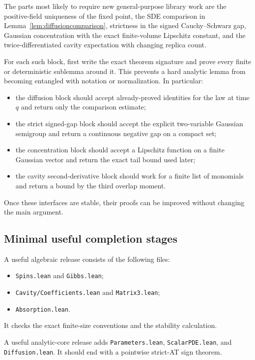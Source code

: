 \documentclass[11pt]{article}
\numberwithin{equation}{section}
\newcommand{\1}{\mathbf 1}
\begin{document}
The parts most likely to require new general-purpose library work are the
positive-field uniqueness of the fixed point, the SDE comparison in
Lemma~\ref{lem:diffusioncomparison}, strictness in the signed
Cauchy--Schwarz gap, Gaussian concentration with the exact finite-volume
Lipschitz constant, and the twice-differentiated cavity expectation with
changing replica count.

For each such block, first write the exact theorem signature and prove every
finite or deterministic sublemma around it.  This prevents a hard analytic
lemma from becoming entangled with notation or normalization.  In
particular:
\begin{itemize}[leftmargin=2em]
\item the diffusion block should accept already-proved identities for the
      law at time $q$ and return only the comparison estimate;
\item the strict signed-gap block should accept the explicit two-variable
      Gaussian semigroup and return a continuous negative gap on a compact
      set;
\item the concentration block should accept a Lipschitz function on a finite
      Gaussian vector and return the exact tail bound used later;
\item the cavity second-derivative block should work for a finite list of
      monomials and return a bound by the third overlap moment.
\end{itemize}
Once these interfaces are stable, their proofs can be improved without
changing the main argument.

\subsection{Minimal useful completion stages}

A useful algebraic release consists of the following files:
\begin{itemize}[leftmargin=2em]
\item \texttt{Spins.lean} and \texttt{Gibbs.lean};
\item \texttt{Cavity/Coefficients.lean} and \texttt{Matrix3.lean};
\item \texttt{Absorption.lean}.
\end{itemize}
It checks the exact finite-size conventions and the stability calculation.

A useful analytic-core release adds \texttt{Parameters.lean},
\texttt{ScalarPDE.lean}, and \texttt{Diffusion.lean}.  It should end with a
pointwise strict-AT sign theorem.
\end{document}
